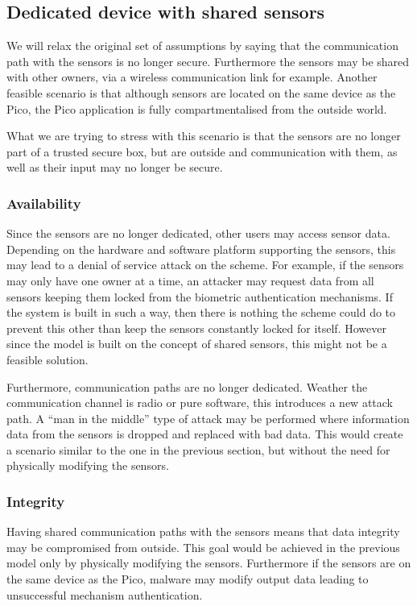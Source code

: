 \subsection{Dedicated device with shared sensors}
We will relax the original set of assumptions by saying that the communication path with the sensors is no longer secure. Furthermore the sensors may be shared with other owners, via a wireless communication link for example. Another feasible scenario is that although sensors are located on the same device as the Pico, the Pico application is fully compartmentalised from the outside world. 

What we are trying to stress with this scenario is that the sensors are no longer part of a trusted secure box, but are outside and communication with them, as well as their input may no longer be secure.

	\subsubsection*{Availability}
	Since the sensors are no longer dedicated, other users may access sensor data. Depending on the hardware and software platform supporting the sensors, this may lead to a denial of service attack on the scheme. For example, if the sensors may only have one owner at a time, an attacker may request data from all sensors keeping them locked from the biometric authentication mechanisms. If the system is built in such a way, then there is nothing the scheme could do to prevent this other than keep the sensors constantly locked for itself. However since the model is built on the concept of shared sensors, this might not be a feasible solution.
	
	Furthermore, communication paths are no longer dedicated. Weather the communication channel is radio or pure software, this introduces a new attack path. A ``man in the middle'' type of attack may be performed where information data from the sensors is dropped and replaced with bad data. This would create a scenario similar to the one in the previous section, but without the need for physically modifying the sensors.
	
	\subsubsection*{Integrity}
	Having shared communication paths with the sensors means that data integrity may be compromised from outside. This goal would be achieved in the previous model only by physically modifying the sensors. Furthermore if the sensors are on the same device as the Pico, malware may modify output data leading to unsuccessful mechanism authentication.
	
